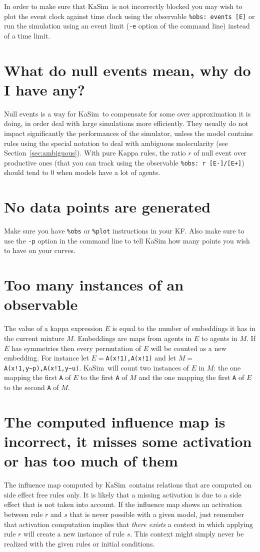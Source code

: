 \documentclass[11pt]{book}
\def\KaSim{\textsf{KaSim}}
\def\intstate{\textasciitilde}
\def\ttt#1{\texttt{#1}}
\begin{document}
In order to make sure that \KaSim~is not incorrectly blocked you may wish to plot the event clock against time clock using the observable \ttt{\%obs: {\textquotesingle}events{\textquotesingle} [E]} or run the simulation using an event limit (\ttt{-e} option of the command line) instead of a time limit.

\section*{What do null events mean, why do I have any?}

Null events is a way for \KaSim~to compensate for some over approximation it is doing, in order deal with large simulations more efficiently. They usually do not impact significantly the performances of the simulator, unless the model contains rules using the special notation to deal with ambiguous molecularity (see Section~\ref{sec:ambiguous}). With pure Kappa rules, the ratio $r$ of null event over productive ones (that you can track using the observable \ttt{\%obs: {\textquotesingle}r{\textquotesingle}  [E-]/[E+]}) should tend to 0 when models have a lot of agents.

\section*{No data points are generated}
Make sure you have \ttt{\%obs} or \ttt{\%plot} instructions in your KF. Also make sure to use the \ttt{-p} option in the command line to tell KaSim how many points you wish to have on your curves. 

\section*{Too many instances of an observable}
The value of a kappa expression $E$  is equal to the number of embeddings it has in the current mixture $M$. Embeddings are maps from agents in $E$  to agents in $M$. If $E$ has symmetries then every permutation of $E$ will be counted as a new embedding. For instance let $E=$\ttt{A(x!1),A(x!1)}  and let $M=$\ttt{A(x!1,y\intstate p),A(x!1,y\intstate u)}. 
\KaSim~will count two instances of $E$ in $M$: the one mapping the first \ttt{A} of $E$ to the first \ttt{A} of $M$ and the one mapping the first \ttt{A} of $E$ to the second \ttt{A} of $M$.
 
\section*{The computed influence map is incorrect, it misses some activation or has too much of them}
The influence map computed by \KaSim~contains relations that are computed on side effect free rules only. It is likely that a missing activation is due to a side effect that is not taken into account. If the influence map shows an activation between rule $r$ and $s$ that is never possible with a given model, just remember that activation computation implies that \emph{there exists} a context in which applying rule $r$ will create a new instance of rule $s$. This context might simply never be realized with the given rules or initial conditions.
\end{document}
